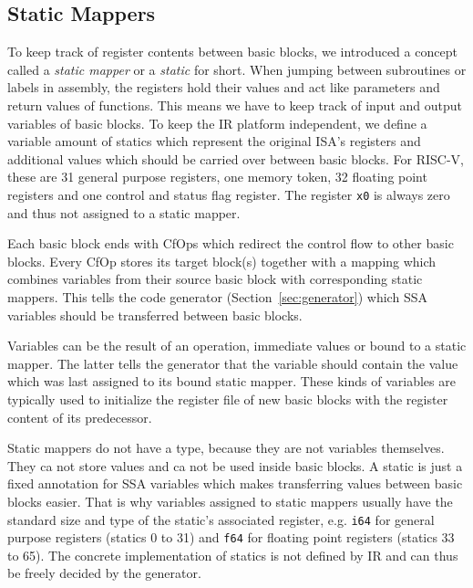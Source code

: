 \documentclass[course=eragp]{aspdoc}
\begin{document}
\subsection{Static Mappers}\label{statics}

To keep track of register contents between basic blocks, we introduced a concept called a
\textit{static mapper} or a \textit{static} for short. When jumping between subroutines or labels in assembly,
the registers hold their values and act like parameters and return values of functions. This means
we have to keep track of input and output variables of basic blocks. To keep the IR platform
independent, we define a variable amount of statics which represent the original ISA's registers and
additional values which should be carried over between basic blocks.
For RISC-V, these are 31 general purpose registers, one memory token, 32 floating point registers
and one control and status flag register. The register \texttt{x0} is always zero and thus not
assigned to a static mapper.

\par

Each basic block ends with CfOps which redirect the control flow to other basic blocks. Every CfOp
stores its target block(s) together with a mapping which combines variables from their source basic
block with corresponding static mappers. This tells the code generator (Section~\ref{sec:generator}) which SSA variables
should be transferred between basic blocks.

\par

Variables can be the result of an operation, immediate values or bound to a static mapper. The
latter tells the generator that the variable should contain the value which was last assigned to
its bound static mapper. These kinds of variables are typically used to initialize the register file
of new basic blocks with the register content of its predecessor.

\par

Static mappers do not have a type, because they are not variables themselves. They ca not store values
and ca not be used inside basic blocks. A static is just a fixed annotation for SSA variables which
makes transferring values between basic blocks easier. That is why variables assigned to static
mappers usually have the standard size and type of the static's associated register, e.g. \texttt{i64} for
general purpose registers (statics 0 to 31) and \texttt{f64} for floating point registers (statics 33
to 65). The concrete implementation of statics is not defined by IR and can thus be freely
decided by the generator.
\end{document}
